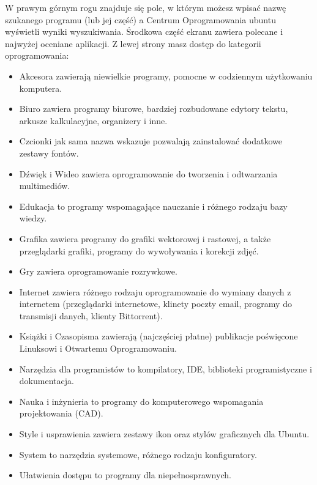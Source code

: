 W prawym górnym rogu znajduje się pole, w którym możesz wpisać nazwę szukanego programu (lub jej część) a Centrum Oprogramowania ubuntu wyświetli wyniki wyszukiwania. Środkowa część ekranu zawiera polecane i najwyżej oceniane aplikacji. Z lewej strony masz dostęp do kategorii oprogramowania:
\begin{itemize}
\item \textcolor{ubuntu_orange}{Akcesora} zawierają niewielkie programy, pomocne w codziennym użytkowaniu komputera.
\item \textcolor{ubuntu_orange}{Biuro} zawiera programy biurowe, bardziej rozbudowane edytory tekstu, arkusze kalkulacyjne, organizery i inne.
\item \textcolor{ubuntu_orange}{Czcionki} jak sama nazwa wskazuje pozwalają zainstalować dodatkowe zestawy fontów.
\item \textcolor{ubuntu_orange}{Dźwięk i Wideo} zawiera oprogramowanie do tworzenia i odtwarzania multimediów.
\item \textcolor{ubuntu_orange}{Edukacja} to programy wspomagające nauczanie i różnego rodzaju bazy wiedzy.
\item \textcolor{ubuntu_orange}{Grafika} zawiera programy do grafiki wektorowej i rastowej, a także przeglądarki grafiki, programy do wywoływania i korekcji zdjęć.
\item \textcolor{ubuntu_orange}{Gry} zawiera oprogramowanie rozrywkowe.
\item \textcolor{ubuntu_orange}{Internet} zawiera różnego rodzaju oprogramowanie do wymiany danych z internetem (przeglądarki internetowe, klinety poczty email, programy do transmisji danych, klienty Bittorrent).
\item \textcolor{ubuntu_orange}{Książki i Czasopisma} zawierają (najczęściej płatne) publikacje poświęcone Linuksowi i Otwartemu Oprogramowaniu.
\item \textcolor{ubuntu_orange}{Narzędzia dla programistów} to kompilatory, IDE, biblioteki programistyczne i dokumentacja.
\item \textcolor{ubuntu_orange}{Nauka i inżynieria} to programy do komputerowego wspomagania projektowania (CAD).
\item \textcolor{ubuntu_orange}{Style i usprawienia} zawiera zestawy ikon oraz stylów graficznych dla Ubuntu.
\item \textcolor{ubuntu_orange}{System} to narzędzia systemowe, różnego rodzaju konfiguratory.
\item \textcolor{ubuntu_orange}{Ułatwienia dostępu} to programy dla niepełnosprawnych.
\end{itemize}


